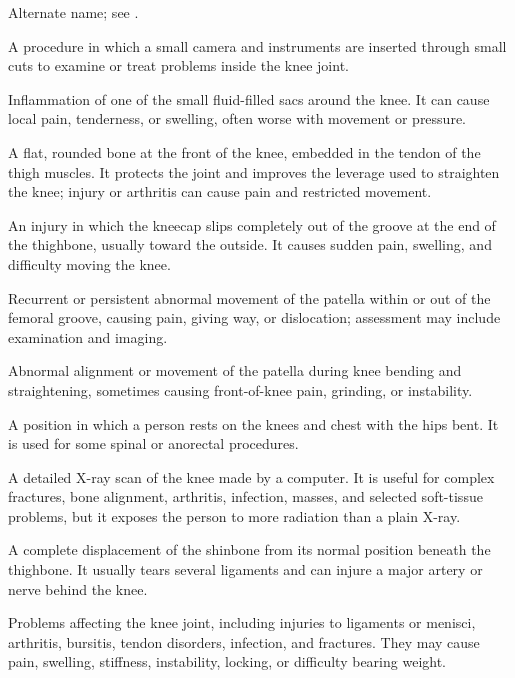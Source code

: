  Alternate name; see .

 A procedure in which a small camera and instruments are inserted through small cuts to examine or treat problems inside the knee joint.

 Inflammation of one of the small fluid-filled sacs around the knee. It can cause local pain, tenderness, or swelling, often worse with movement or pressure.

 A flat, rounded bone at the front of the knee, embedded in the tendon of the thigh muscles. It protects the joint and improves the leverage used to straighten the knee; injury or arthritis can cause pain and restricted movement.

 An injury in which the kneecap slips completely out of the groove at the end of the thighbone, usually toward the outside. It causes sudden pain, swelling, and difficulty moving the knee.

 Recurrent or persistent abnormal movement of the patella within or out of the femoral groove, causing pain, giving way, or dislocation; assessment may include examination and imaging.

 Abnormal alignment or movement of the patella during knee bending and straightening, sometimes causing front-of-knee pain, grinding, or instability.

 A position in which a person rests on the knees and chest with the hips bent. It is used for some spinal or anorectal procedures.

 A detailed X-ray scan of the knee made by a computer. It is useful for complex fractures, bone alignment, arthritis, infection, masses, and selected soft-tissue problems, but it exposes the person to more radiation than a plain X-ray.

 A complete displacement of the shinbone from its normal position beneath the thighbone. It usually tears several ligaments and can injure a major artery or nerve behind the knee.

 Problems affecting the knee joint, including injuries to ligaments or menisci, arthritis, bursitis, tendon disorders, infection, and fractures. They may cause pain, swelling, stiffness, instability, locking, or difficulty bearing weight.

